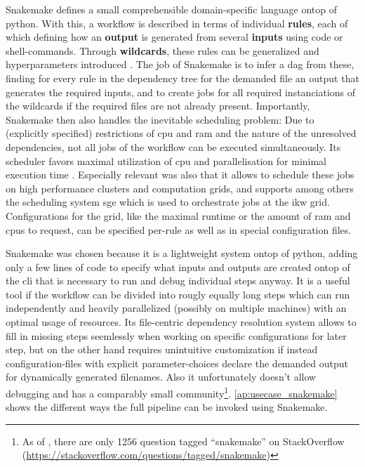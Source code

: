 Snakemake defines a small comprehensible domain-specific language ontop of python. With this, a workflow is described in terms of individual \textbf{rules}, each of which defining how an \textbf{output} is generated from several \textbf{inputs} using code or shell-commands. Through \textbf{wildcards}, these rules can be generalized and hyperparameters introduced \cite{Molder2021a}. The job of Snakemake is to infer a \gls{dag} from these, finding for every rule in the dependency tree for the demanded file an output that generates the required inputs, and to create jobs for all required instanciations of the wildcards if the required files are not already present. Importantly, Snakemake then also handles the inevitable scheduling problem: Due to (explicitly specified) restrictions of \acrshort{cpu} and \acrshort{ram} and the nature of the unresolved dependencies, not all jobs of the workflow can be executed simultaneously. Its scheduler favors maximal utilization of \acrshort{cpu} and parallelisation for minimal execution time \cite{Molder2021a}. Especially relevant was also that it allows to schedule these jobs on high performance clusters and computation grids, and supports among others the scheduling system \gls{sge} which is used to orchestrate jobs at the \gls{ikw} grid. Configurations for the grid, like the maximal runtime or the amount of \gls{ram} and \glspl{cpu} to request, can be specified per-rule as well as in special configuration files.

Snakemake was chosen because it is a lightweight system ontop of python, adding only a few lines of code to specify what inputs and outputs are created ontop of the \gls{cli} that is necessary to run and debug individual steps anyway. It is a useful tool if the workflow can be divided into rougly equally long steps which can run independently and heavily parallelized (possibly on multiple machines) with an optimal usage of resources. Its file-centric dependency resolution system allows to fill in missing steps seemlessly when working on specific configurations for later step, but on the other hand requires unintuitive customization if instead configuration-files with explicit parameter-choices declare the demanded output for dynamically generated filenames. Also it unfortunately doesn't allow debugging and has a comparably small community\footnote{As of , there are only 1256 question tagged ``snakemake'' on StackOverflow (\url{https://stackoverflow.com/questions/tagged/snakemake})}. \autoref{ap:usecase_snakemake} shows the different ways the full pipeline can be invoked using Snakemake.

